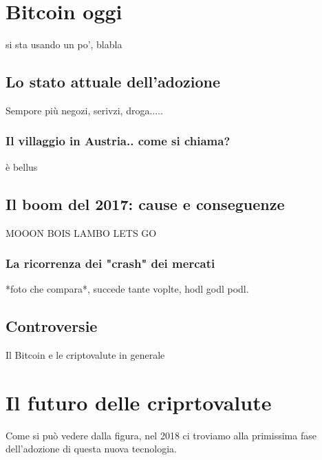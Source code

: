 \documentclass {article}
\begin{document}
\section {Bitcoin oggi}

si sta usando un po', blabla

\subsection {Lo stato attuale dell'adozione}

Sempore più negozi, serivzi, droga.....

\subsubsection {Il villaggio in Austria.. come si chiama?}

è bellus

\subsection {Il boom del 2017: cause e conseguenze}

MOOON BOIS LAMBO LETS GO

\subsubsection {La ricorrenza dei "crash" dei mercati}

*foto che compara*, succede tante voplte, hodl godl podl.

\subsection {Controversie}

Il Bitcoin e le criptovalute in generale

\section {Il futuro delle criprtovalute}

Come si può vedere dalla figura, nel 2018 ci troviamo alla primissima fase dell'adozione di questa nuova tecnologia.
\end{document}

